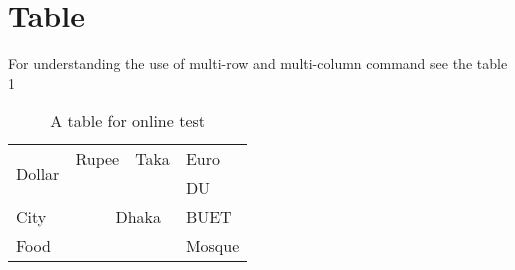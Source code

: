 \documentclass{article}
\begin{document}
\section{Table}
For understanding the use of multi-row and multi-column command see the
table 1
\begin{table}[htpb]
    \centering
    \begin{tabular}{llll}
        \hline
        \multicolumn{1}{|l|}{\multirow{2}{*}{Dollar}} & \multicolumn{1}{l|}{Rupee} & \multicolumn{1}{l|}{Taka} & \multicolumn{1}{l|}{Euro}   \\ \cline{2-4} 
        \multicolumn{1}{|l|}{}                        & \multicolumn{2}{l|}{}                                  & \multicolumn{1}{|l|}{DU}     \\ \cline{4-4} 
        \multicolumn{1}{|l|}{City}                    & \multicolumn{2}{l}{\ \ \ \ \ Dhaka}                              & \multicolumn{1}{l|}{BUET}                        \\ \cline{1-1} \cline{4-4} 
        \multicolumn{1}{|l|}{Food}                   & \multicolumn{2}{l|}{}                                  & \multicolumn{1}{l|}{Mosque} \\ \cline{1-4}
    \end{tabular}
    \caption{A table for online test}
\end{table}
\end{document}
